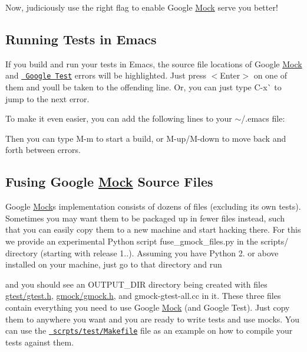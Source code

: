 Now, judiciously use the right flag to enable Google \mbox{\hyperlink{class_mock}{Mock}} serve you better!

\subsection*{Running Tests in Emacs}

If you build and run your tests in Emacs, the source file locations of Google \mbox{\hyperlink{class_mock}{Mock}} and \href{http://code.google.com/p/googletest/}\texttt{ Google Test} errors will be highlighted. Just press {\ttfamily $<$Enter$>$} on one of them and you\textquotesingle{}ll be taken to the offending line. Or, you can just type {\ttfamily C-\/x}\`{} to jump to the next error.

To make it even easier, you can add the following lines to your {\ttfamily $\sim$/.emacs} file\+:


\begin{DoxyCode}{0}
\end{DoxyCode}


Then you can type {\ttfamily M-\/m} to start a build, or {\ttfamily M-\/up}/{\ttfamily M-\/down} to move back and forth between errors.

\subsection*{Fusing Google \mbox{\hyperlink{class_mock}{Mock}} Source Files}

Google \mbox{\hyperlink{class_mock}{Mock}}\textquotesingle{}s implementation consists of dozens of files (excluding its own tests). Sometimes you may want them to be packaged up in fewer files instead, such that you can easily copy them to a new machine and start hacking there. For this we provide an experimental Python script {\ttfamily fuse\+\_\+gmock\+\_\+files.\+py} in the {\ttfamily scripts/} directory (starting with release 1..). Assuming you have Python 2. or above installed on your machine, just go to that directory and run 
\begin{DoxyCode}{0}
\end{DoxyCode}


and you should see an {\ttfamily O\+U\+T\+P\+U\+T\+\_\+\+D\+IR} directory being created with files {\ttfamily \mbox{\hyperlink{gtest_8h_source}{gtest/gtest.\+h}}}, {\ttfamily \mbox{\hyperlink{gmock_8h_source}{gmock/gmock.\+h}}}, and {\ttfamily gmock-\/gtest-\/all.\+cc} in it. These three files contain everything you need to use Google \mbox{\hyperlink{class_mock}{Mock}} (and Google Test). Just copy them to anywhere you want and you are ready to write tests and use mocks. You can use the \href{http://code.google.com/p/googlemock/source/browse/trunk/scripts/test/Makefile}\texttt{ scrpts/test/\+Makefile} file as an example on how to compile your tests against them.

